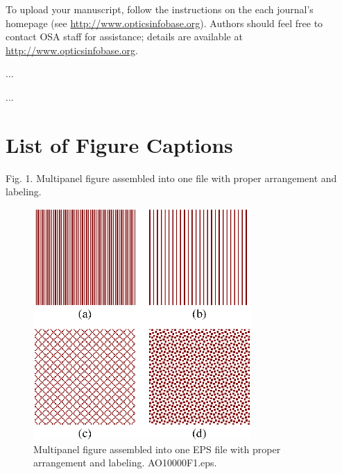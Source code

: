\documentclass[12pt,letterpaper]{article}          %
\begin{document}
To upload your manuscript, follow the instructions on the each
journal's homepage (see \mbox{\href{http://www.opticsinfobase.org}{http://www.opticsinfobase.org}}).
Authors should feel free to contact OSA staff for assistance; details are available at \href{InfoBase}{http://www.opticsinfobase.org}.





\begin{thebibliography}{99}

 ...

 ...

\end{thebibliography}

\newpage

\section*{List of Figure Captions}

Fig. 1. Multipanel figure assembled into one file with proper
arrangement and labeling.



\newpage
  \begin{figure}[htbp]
  \centering
  \includegraphics[width=8.3cm]{OT10000F1.eps}
  \caption{Multipanel figure assembled into one EPS file with proper arrangement and labeling. AO10000F1.eps.}
  \end{figure}
\end{document}
